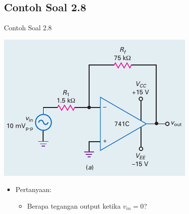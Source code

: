 \subsection{Contoh Soal 2.8}
\begin{frame}{Contoh Soal 2.8}
	\begin{multicols}{2}
		\begin{center}
			\includegraphics[width=\linewidth]{gambar/fig-16.17a}
		\end{center}
		\columnbreak
		\begin{itemize}
			\item Pertanyaan:
			\begin{itemize}
				\item Berapa tegangan output ketika $ v_{in} = 0 $?
			\end{itemize}
		\end{itemize}
	\end{multicols}
\end{frame}

